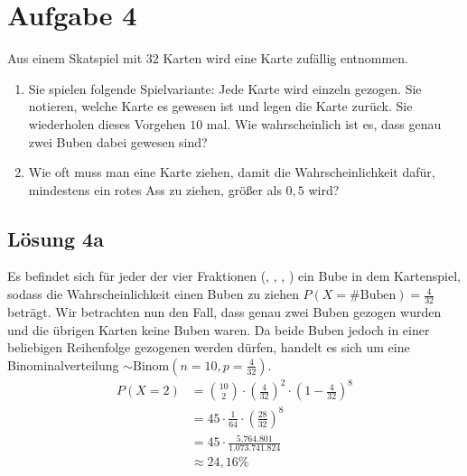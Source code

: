 \documentclass[main.tex]{subfiles}
\begin{document}
\section{Aufgabe 4}
Aus einem Skatspiel mit $32$ Karten wird eine Karte zufällig entnommen.
\begin{enumerate}
\item Sie spielen folgende Spielvariante: Jede Karte wird einzeln gezogen. Sie notieren, welche Karte es gewesen ist und legen die Karte zurück. Sie wiederholen dieses Vorgehen $10$ mal. Wie wahrscheinlich ist es, dass genau zwei Buben dabei gewesen sind?
\item Wie oft muss man eine Karte ziehen, damit die Wahrscheinlichkeit dafür, mindestens ein rotes Ass zu ziehen, größer als $0,5$ wird?
\end{enumerate}

\subsection{Lösung 4a}
\setlength{\twemojiDefaultHeight}{0.8em}
Es befindet sich für jeder der vier Fraktionen
(,
,
,
)
ein Bube in dem Kartenspiel, sodass die Wahrscheinlichkeit einen Buben zu ziehen $P(X = \# \text{Buben}) = \frac{4}{32}$ beträgt.
Wir betrachten nun den Fall, dass genau zwei Buben gezogen wurden und die übrigen Karten keine Buben waren. Da beide Buben jedoch in einer beliebigen Reihenfolge gezogenen werden dürfen, handelt es sich um eine Binominalverteilung $\sim \text{Binom}(n=10, p=\frac{4}{32})$.
$$\begin{aligned}
    P(X{=}2) &= \binom{10}{2} \cdot \left(\frac{4}{32}\right)^2 \cdot \left(1- \frac{4}{32}\right)^8 \\
    &= 45 \cdot \frac{1}{64} \cdot \left(\frac{28}{32}\right)^8 \\[2mm]
    &= 45 \cdot \frac{5.764.801}{1.073.741.824} \\[2mm]
    &\approx 24,16 \%
\end{aligned}$$
\end{document}

